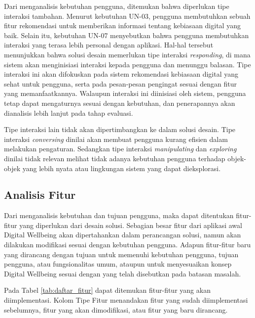 Dari menganalisis kebutuhan pengguna, ditemukan bahwa diperlukan tipe interaksi tambahan. Menurut kebutuhan UN-03, pengguna membutuhkan sebuah fitur rekomendasi untuk memberikan informasi tentang kebiasaan digital yang baik. Selain itu, kebutuhan UN-07 menyebutkan bahwa pengguna membutuhkan interaksi yang terasa lebih personal dengan aplikasi. Hal-hal tersebut menunjukkan bahwa solusi desain memerlukan tipe interaksi \textit{responding}, di mana sistem akan menginisiasi interaksi kepada pengguna dan menunggu balasan. Tipe interaksi ini akan difokuskan pada sistem rekomendasi kebiasaan digital yang sehat untuk pengguna, serta pada pesan-pesan pengingat sesuai dengan fitur yang memanfaatkannya. Walaupun interaksi ini diinisiasi oleh sistem, pengguna tetap dapat mengaturnya sesuai dengan kebutuhan, dan penerapannya akan dianalisis lebih lanjut pada tahap evaluasi.

Tipe interaksi lain tidak akan dipertimbangkan ke dalam solusi desain. Tipe interaksi \textit{conversing} dinilai akan membuat pengguna kurang efisien dalam melakukan pengaturan. Sedangkan tipe interaksi \textit{manipulating} dan \textit{exploring} dinilai tidak relevan melihat tidak adanya kebutuhan pengguna terhadap objek-objek yang lebih nyata atau lingkungan sistem yang dapat dieksplorasi.


\subsection{Analisis Fitur}
\label{subsec:analisis_fitur}

Dari menganalisis kebutuhan dan tujuan pengguna, maka dapat ditentukan fitur-fitur yang diperlukan dari desain solusi. Sebagian besar fitur dari aplikasi awal Digital Wellbeing akan dipertahankan dalam perancangan solusi, namun akan dilakukan modifikasi sesuai dengan kebutuhan pengguna. Adapun fitur-fitur baru yang dirancang dengan tujuan untuk memenuhi kebutuhan pengguna, tujuan pengguna, atau fungsionalitas umum, ataupun untuk menyesuaikan konsep Digital Wellbeing sesuai dengan yang telah disebutkan pada batasan masalah.

Pada Tabel \ref{tab:daftar_fitur} dapat ditemukan fitur-fitur yang akan diimplementasi. Kolom Tipe Fitur menandakan fitur yang sudah diimplementasi sebelumnya, fitur yang akan dimodifikasi, atau fitur yang baru dirancang. 

